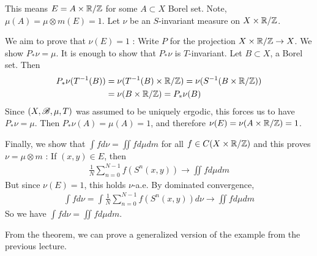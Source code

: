 \documentclass[12pt,a4paper]{report}
\newenvironment{proof}
{\begin{changemargin}{1cm}{0.5cm} 
	}%
	{\end{changemargin}
}
\begin{document}
\begin{proof}
This means $E = A\times \mathbb{R}/ \mathbb{Z}$ for some $A\subset X$ Borel set. Note, $\mu(A) = \mu \otimes m(E) =1$. Let $\nu$ be an $S$-invariant measure on $X\times \mathbb{R}/\mathbb{Z}$.

\quad We aim to prove that $\nu(E) =1$ : Write $P$ for the projection $X\times \mathbb{R}/ \mathbb{Z} \rightarrow X$. We show $P_* \nu = \mu$. It is enough to show that $P_* \nu$ is $T$-invariant. Let $B\subset X$, a Borel set. Then
\begin{align*}
P_* \nu(T^{-1}(B)) &= \nu(T^{-1} (B) \times \mathbb{R}/\mathbb{Z}) = \nu (S^{-1}(B\times \mathbb{R}/ \mathbb{Z}))\\
&= \nu(B\times \mathbb{R}/\mathbb{Z}) = P_* \nu(B)
\end{align*}
Since $(X,\mathscr{B},\mu,T)$ was assumed to be uniquely ergodic, this forces us to have $P_* \nu =\mu$. Then $P_*\nu(A) = \mu(A) =1$, and therefore $\nu(E) = \nu(A\times \mathbb{R}/ \mathbb{Z})=1$.

\quad Finally, we show that $\int f d\nu = \iint f d\mu dm$ for all $f\in C(X\times \mathbb{R}/ \mathbb{Z})$ and this proves $\nu = \mu \otimes m$ : If $(x,y) \in E$, then
\begin{align*}
\frac{1}{N} \sum_{n=0}^{N-1} f(S^n (x,y)) \rightarrow \iint f d\mu dm
\end{align*}
But since $\nu(E) = 1$, this holds $\nu$-a.e. By dominated convergence,
\begin{align*}
\int f d\nu = \int \frac{1}{N} \sum_{n=0}^{N-1} f(S^n(x,y)) d\nu \rightarrow \iint fd\mu dm
\end{align*}
So we have $\int fd\nu = \iint fd\mu dm$.

\eop
\end{proof}
\s

From the theorem, we can prove a generalized version of the example from the previous lecture.
\s
\end{document}

